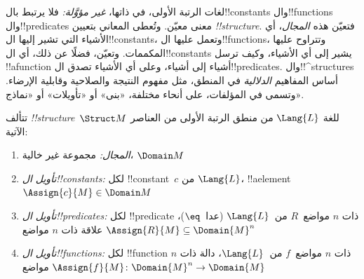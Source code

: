 \documentclass[../../../include/open-logic-section]{subfiles}
\begin{document}


\begin{explain}
لغات الرتبة الأولى، في ذاتها، \emph{غير مؤوَّلة:} فلا يرتبط
بال!!{constant}s وال!!{function}s وال!!{predicate}s معنى معيّن.
وتُعطى المعاني بتعيين  \emph{!!{structure}}.
فتعيّن هذه \emph{المجال}، أي الأشياء التي تشير إليها
ال!!{constant}s، وتعمل عليها ال!!{function}s، وتتراوح عليها
المكممات. وتعيّن، فضلًا عن ذلك، أي ال!!{constant}s يشير إلى أي
الأشياء، وكيف ترسل !!a{function} أشياء إلى أشياء، وعلى أي الأشياء
تصدق ال!!{predicate}s. وال!!^{structure}s أساس المفاهيم
\emph{الدلالية} في المنطق، مثل مفهوم النتيجة والصلاحية وقابلية
الإرضاء. وتسمى في المؤلفات، على أنحاء مختلفة، «بنى» أو «تأويلات» أو
«نماذج».
\end{explain}

\begin{defn}[!!^{structure}s]
تتألف  \emph{!!{structure}}~$\Struct M$ للغة
$\Lang{L}$ من منطق الرتبة الأولى من العناصر الآتية:
\begin{enumerate}
\item \emph{المجال:} مجموعة غير خالية، $\Domain M$
\item \emph{تأويل ال!!{constant}s:} لكل !!{constant}~$c$ من
  $\Lang{L}$، !!a{element}~$\Assign{c}{M} \in \Domain M$
\item \emph{تأويل ال!!{predicate}s:} لكل !!{predicate} ذات
  $n$ مواضع~$R$ من~$\Lang{L}$ (عدا~$\eq$)، علاقة ذات $n$ مواضع
  $\Assign{R}{M} \subseteq \Domain{M}^n$
\item \emph{تأويل ال!!{function}s:} لكل !!{function} ذات
  $n$ مواضع~$f$ من~$\Lang{L}$، دالة ذات $n$ مواضع
  $\Assign{f}{M} \colon \Domain{M}^n \to \Domain{M}$
\end{enumerate}
\end{defn}
\end{document}
